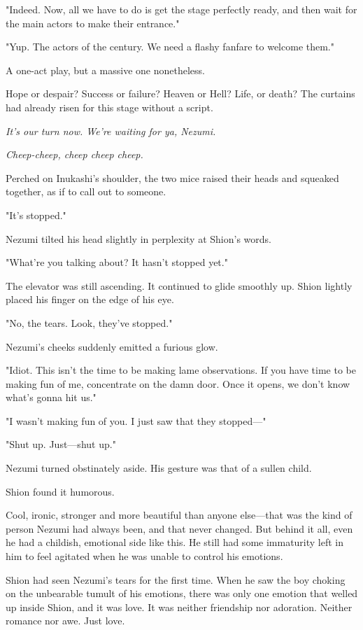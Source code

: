 "Indeed. Now, all we have to do is get the stage perfectly ready, and
then wait for the main actors to make their entrance."

"Yup. The actors of the century. We need a flashy fanfare to welcome
them."

A one-act play, but a massive one nonetheless.

Hope or despair? Success or failure? Heaven or Hell? Life, or death? The
curtains had already risen for this stage without a script.

\emph{It's our turn now. We're waiting for ya, Nezumi.}

\emph{Cheep-cheep, cheep cheep cheep.}

Perched on Inukashi's shoulder, the two mice raised their heads and
squeaked together, as if to call out to someone.

\myspace

"It's stopped."

Nezumi tilted his head slightly in perplexity at Shion's words.

"What're you talking about? It hasn't stopped yet."

The elevator was still ascending. It continued to glide smoothly up.
Shion lightly placed his finger on the edge of his eye.

"No, the tears. Look, they've stopped."

Nezumi's cheeks suddenly emitted a furious glow.

"Idiot. This isn't the time to be making lame observations. If you have
time to be making fun of me, concentrate on the damn door. Once it
opens, we don't know what's gonna hit us."

"I wasn't making fun of you. I just saw that they stopped---"

"Shut up. Just---shut up."

Nezumi turned obstinately aside. His gesture was that of a sullen child.

Shion found it humorous.

Cool, ironic, stronger and more beautiful than anyone else---that was the
kind of person Nezumi had always been, and that never changed. But
behind it all, even he had a childish, emotional side like this. He
still had some immaturity left in him to feel agitated when he was
unable to control his emotions.

Shion had seen Nezumi's tears for the first time. When he saw the boy
choking on the unbearable tumult of his emotions, there was only one
emotion that welled up inside Shion, and it was love. It was neither
friendship nor adoration. Neither romance nor awe. Just love.


